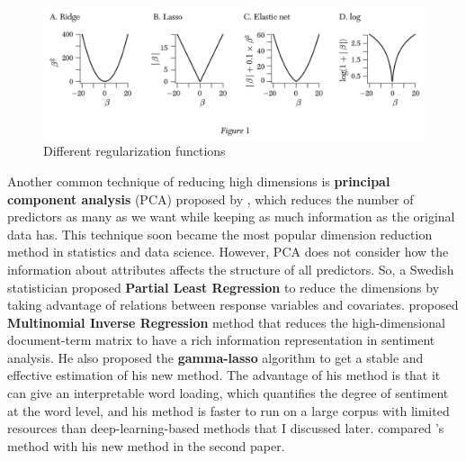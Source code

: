 \documentclass[aoas]{imsart}
\numberwithin{equation}{section}
\theoremstyle{plain}
\theoremstyle{remark}
\begin{document}
\begin{figure}[ht]
\includegraphics[scale=0.4]{img/reg.png}
\caption{Different regularization functions}
\label{Fig4: reg}
\end{figure}
Another common technique of reducing high dimensions is \textbf{principal component analysis} (PCA) proposed by \cite{1570572700669207808}, which reduces the number of predictors as many as we want while keeping as much information as the original data has. This technique soon became the most popular dimension reduction method in statistics and data science. However, PCA does not consider how the information about attributes affects the structure of all predictors. So, a Swedish statistician \cite{pls} proposed \textbf{Partial Least Regression} to reduce the dimensions by taking advantage of relations between response variables and covariates. \cite{doi:10.1080/01621459.2012.734168} proposed \textbf{Multinomial Inverse Regression} method that reduces the high-dimensional document-term matrix to have a rich information representation in sentiment analysis. He also proposed the \textbf{gamma-lasso} algorithm to get a stable and effective estimation of his new method. The advantage of his method is that it can give an interpretable word loading, which quantifies the degree of sentiment at the word level, and his method is faster to run on a large corpus with limited resources than deep-learning-based methods that I discussed later. \cite{chenyu} compared \cite{doi:10.1080/01621459.2012.734168}'s method with his new method in the second paper. 
\end{document}
